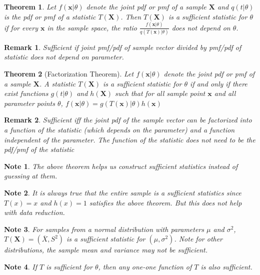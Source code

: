 \documentclass[14pt,twoside]{extreport}
\theoremstyle{dotless}
\newtheorem*{thm}{Theorem} %
\newtheorem*{note}{Note} %
\newtheorem*{remark}{Remark} %
\begin{document}
\begin{thm}
    Let $f(\bm{x}|\theta)$ denote the joint pdf or pmf of a sample $\bm{X}$ and $q(t|\theta)$ is the pdf or pmf of a statistic $T(\bm{X})$. 
    Then $T(\bm{X})$ is a sufficient statistic for $\theta$ if for every $\bm{x}$ in the sample space, the ratio $\frac{f(\bm{x}|\theta)}{q(T(\bm{x})|\theta)}$ does not depend on $\theta$.
\end{thm}

\begin{remark}
    Sufficient if joint pmf/pdf of sample vector divided by pmf/pdf of statistic does not depend on parameter.
\end{remark}

\begin{thm}[Factorization Theorem]
    Let $f(\bm{x}|\theta)$ denote the joint pdf or pmf of a sample $\bm{X}$. A statistic $T(\bm{X})$ is a sufficient statistic for $\theta$ if and only if there exist functions $g(t|\theta)$ and $h(\bm{X})$ such that for all sample point $\bm{x}$ and all parameter points $\theta$, $f(\bm{x}|\theta) = g(T(\bm{x})|\theta) h(\bm{x})$
\end{thm}

\begin{remark}
    Sufficient iff the joint pdf of the sample vector can be factorized into a function of the statistic (which depends on the parameter) and a function independent of the parameter. The function of the statistic does not need to be the pdf/pmf of the statistic
\end{remark}

\begin{note}
    The above theorem helps us construct sufficient statistics instead of guessing at them.
\end{note}

\begin{note}
    It is always true that the entire sample is a sufficient statistics since $T(x)=x$ and $h(x) = 1$ satisfies the above theorem. But this does not help with data reduction.
\end{note}

\begin{note}
    For samples from a normal distribution with parameters $\mu$ and $\sigma^2$, $T(\bm{X}) = (\overline{X}, S^2)$ is a sufficient statistic for $(\mu, \sigma^2)$.
Note for other distributions, the sample mean and variance may not be sufficient.
\end{note}

\begin{note}
    If $T$ is sufficient for $\theta$, then any one-one function of $T$ is also sufficient.
\end{note}
\end{document}
